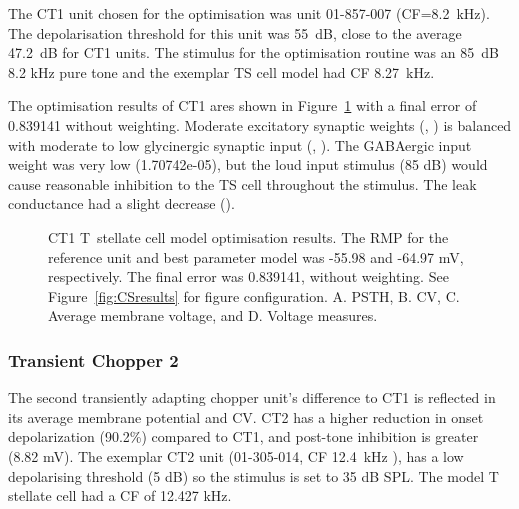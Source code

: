 The CT1 unit chosen for the optimisation was unit 01-857-007
\citep{PaoliniClareyEtAl:2005} (CF=8.2~kHz).  The depolarisation threshold for
this unit was 55~dB, close to the average 47.2~dB for CT1 units. The stimulus
for the optimisation routine was an 85~dB 8.2 kHz pure tone and the exemplar TS
cell model had CF 8.27~kHz.


The optimisation results of CT1 ares shown in Figure~\ref{fig:CT1results} with a
final error of 0.839141 without weighting.  Moderate excitatory synaptic weights
(, ) is balanced with moderate to low
glycinergic synaptic input (, ). The
GABAergic input weight was very low (\wGLGTS 1.70742e-05), but the loud input
stimulus (85 dB) would cause reasonable inhibition to the TS cell throughout the
stimulus.  The leak conductance had a slight decrease ().


\begin{figure}[htb]
  \centering
  \caption[CT1 T~stellate Optimisation results]{CT1 T~stellate cell model
    optimisation results. The RMP for the reference unit and best parameter
    model was -55.98 and -64.97 mV, respectively. The final error was 0.839141,
    without weighting. See Figure~\ref{fig:CSresults} for figure configuration.
    A. PSTH, B. CV, C. Average membrane voltage, and D. Voltage measures.}
  \label{fig:CT1results}
\end{figure}

\clearpage
\subsubsection{Transient Chopper 2}


The second transiently adapting chopper unit's difference to CT1 is reflected in
its average membrane potential and CV. CT2 has a higher reduction in onset
depolarization (90.2\%) compared to CT1, and post-tone inhibition is greater
(8.82 mV).  The exemplar CT2 unit (01-305-014, CF 12.4~kHz \citep*{PaoliniClareyEtAl:2005}),
has a low depolarising threshold (5 dB) so the stimulus is set to 35 dB SPL. The model T stellate cell had a CF of 12.427 kHz.

